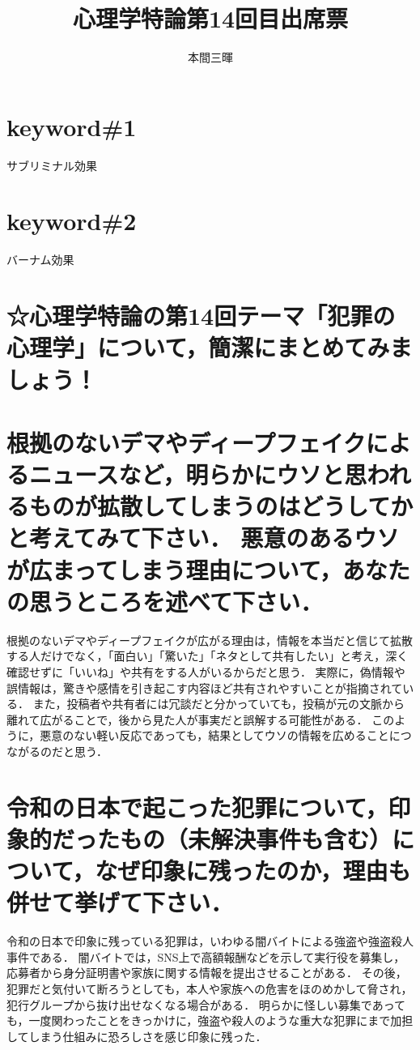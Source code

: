 \documentclass[titlepage,a4paper]{jsarticle}
\title{心理学特論第14回目出席票}
\author{本間三暉}
\begin{document}
\maketitle
\section*{keyword\#1}
サブリミナル効果
\section*{keyword\#2}
バーナム効果
\section*{☆心理学特論の第14回テーマ「犯罪の心理学」について，簡潔にまとめてみましょう！}
\section{根拠のないデマやディープフェイクによるニュースなど，明らかにウソと思われるものが拡散してしまうのはどうしてかと考えてみて下さい．
悪意のあるウソが広まってしまう理由について，あなたの思うところを述べて下さい．}
根拠のないデマやディープフェイクが広がる理由は，情報を本当だと信じて拡散する人だけでなく，「面白い」「驚いた」「ネタとして共有したい」と考え，深く確認せずに「いいね」や共有をする人がいるからだと思う．
実際に，偽情報や誤情報は，驚きや感情を引き起こす内容ほど共有されやすいことが指摘されている．
また，投稿者や共有者には冗談だと分かっていても，投稿が元の文脈から離れて広がることで，後から見た人が事実だと誤解する可能性がある．
このように，悪意のない軽い反応であっても，結果としてウソの情報を広めることにつながるのだと思う．

\section{令和の日本で起こった犯罪について，印象的だったもの（未解決事件も含む）について，なぜ印象に残ったのか，理由も併せて挙げて下さい．}
令和の日本で印象に残っている犯罪は，いわゆる闇バイトによる強盗や強盗殺人事件である．
闇バイトでは，SNS上で高額報酬などを示して実行役を募集し，応募者から身分証明書や家族に関する情報を提出させることがある．
その後，犯罪だと気付いて断ろうとしても，本人や家族への危害をほのめかして脅され，犯行グループから抜け出せなくなる場合がある．
明らかに怪しい募集であっても，一度関わったことをきっかけに，強盗や殺人のような重大な犯罪にまで加担してしまう仕組みに恐ろしさを感じ印象に残った．
\end{document}
